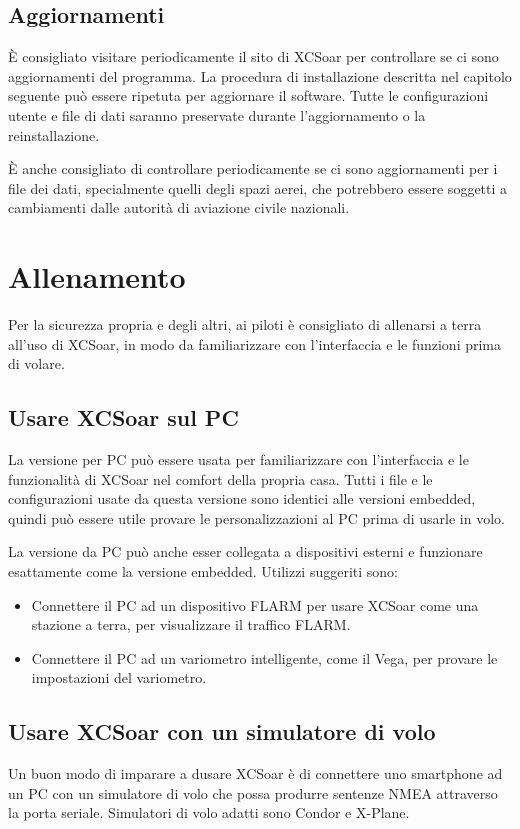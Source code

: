 \subsection*{Aggiornamenti}
È consigliato visitare periodicamente il sito di XCSoar per controllare
se ci sono aggiornamenti del programma.
La procedura di installazione descritta nel capitolo seguente può essere 
ripetuta per aggiornare il software.
Tutte le configurazioni utente e file di dati saranno preservate durante
l'aggiornamento o la reinstallazione.

È anche consigliato di controllare periodicamente se ci sono aggiornamenti
per i file dei dati, specialmente quelli degli spazi aerei, che potrebbero
essere soggetti a cambiamenti dalle autorità di aviazione civile nazionali.

\section{Allenamento}
Per la sicurezza propria e degli altri, ai piloti è consigliato di allenarsi
a terra all'uso di XCSoar, in modo da familiarizzare con l'interfaccia e le
funzioni prima di volare.

\subsection*{Usare XCSoar sul PC}
La versione per PC può essere usata per familiarizzare con l'interfaccia
e le funzionalità di XCSoar nel comfort della propria casa. Tutti i file e
le configurazioni usate da questa versione sono identici alle versioni embedded,
quindi può essere utile provare le personalizzazioni al PC prima di usarle
in volo.

La versione da PC può anche esser collegata a dispositivi esterni e funzionare
esattamente come la versione embedded. Utilizzi suggeriti sono:
\begin{itemize}
\item Connettere il PC ad un dispositivo FLARM per usare XCSoar come una
stazione a terra, per visualizzare il traffico FLARM.
\item Connettere il PC ad un variometro intelligente, come il Vega, per provare
le impostazioni del variometro.
\end{itemize}

\subsection*{Usare XCSoar con un simulatore di volo}
Un buon modo di imparare a dusare XCSoar è di connettere uno smartphone
ad un PC con un simulatore di volo che possa produrre sentenze NMEA
attraverso la porta seriale.
Simulatori di volo adatti sono Condor e X-Plane.  

